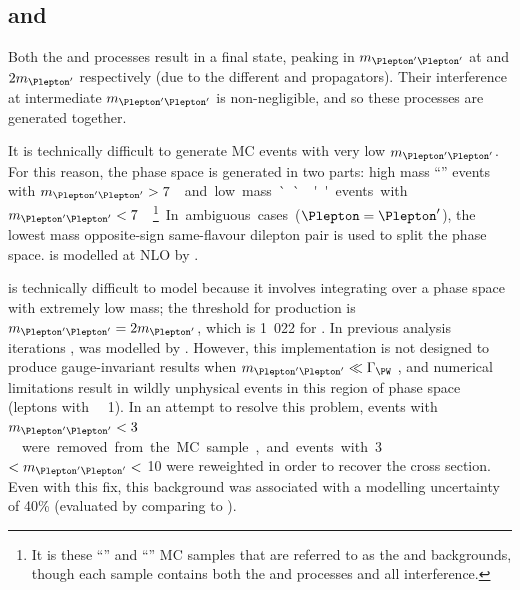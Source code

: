 \subsection{\WZ and \Wgstar}
\label{sec:diboson:wgstar}

Both the \WZ and \Wgstar processes result in a  
final state, peaking in $m_{\HepProcess{\Plepton'\Plepton'}}$ at \mZ and 
$2m_{\Plepton'}$ respectively (due to the different \PZ and \Pphoton propagators). Their 
interference at intermediate $m_{\HepProcess{\Plepton'\Plepton'}}$ is non-negligible, and 
so these processes are generated together.

It is technically difficult to generate MC events with very low 
$m_{\HepProcess{\Plepton'\Plepton'}}$. For this reason, the phase space is generated in two 
parts: high mass ``\WZ'' events with \unit{$m_{\HepProcess{\Plepton'\Plepton'}} > 7$}{\GeV} 
and low mass ``\Wgstar'' events with 
\unit{$m_{\HepProcess{\Plepton'\Plepton'}} < 7$}{\GeV}.\footnote{
	It is these ``\WZ'' and ``\Wgstar''	MC samples that are referred to as the \WZ and 
	\Wgstar backgrounds, though each sample contains both the \WZ and \Wgstar processes and 
	all interference.
}
In ambiguous cases ($\Plepton = \Plepton'$), the lowest mass opposite-sign same-flavour 
dilepton pair is used to split the phase space. \WZ is modelled at NLO by 
.

\Wgstar is technically difficult to model because it involves integrating over a phase 
space with extremely low mass; the threshold for production is 
$m_{\HepProcess{\Plepton'\Plepton'}} = 2m_{\Plepton'}$, which is \unit{1.022}{\MeV} for 
\HepProcess{\Plepton\Pnu\Pe\Pe}. In previous analysis iterations 
\cite{ATLAS:combination:2013}, \Wgstar was modelled by . 
However, this implementation is not designed to produce gauge-invariant results when 
$m_{\HepProcess{\Plepton'\Plepton'}} \ll \Gamma_{\PW}$ \cite{MadGraph:Wgstar}, and numerical 
limitations result in wildly unphysical events in this region of phase space 
(\eg leptons with \unit{\pt~\about~1}{\TeV}). In an attempt to resolve this problem, events 
with \unit{$m_{\HepProcess{\Plepton'\Plepton'}} < 3$}{\MeV} were removed from the MC 
sample, and events with \unit{3}{\MeV} $< m_{\HepProcess{\Plepton'\Plepton'}} <$ 
\unit{10}{\MeV} were reweighted in order to recover the cross section. Even with this fix, 
this background was associated with a modelling uncertainty of 40\% (evaluated by comparing 
to \sherpa).

